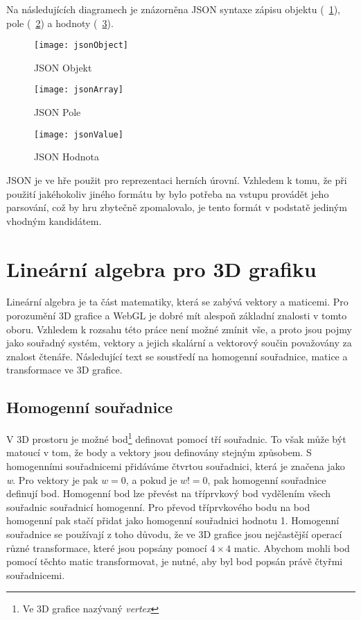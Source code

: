 Na následujících diagramech je znázorněna JSON syntaxe zápisu objektu (\figurename\ \ref{fig:jsonObject}), pole (\figurename\ \ref{fig:jsonArray}) a hodnoty (\figurename\ \ref{fig:jsonValue}).

\begin{figure}[htb]
\centering
\texttt{[image: jsonObject]}
\caption{JSON Objekt}
\label{fig:jsonObject}
\end{figure}

\begin{figure}[htb]
\centering
\texttt{[image: jsonArray]}
\caption{JSON Pole}
\label{fig:jsonArray}
\end{figure}

\begin{figure}[htb]
\centering
\texttt{[image: jsonValue]}
\caption{JSON Hodnota}
\label{fig:jsonValue}
\end{figure}

JSON je ve hře použit pro reprezentaci herních úrovní. Vzhledem k tomu, že při použití jakéhokoliv jiného formátu by bylo potřeba na vstupu provádět jeho parsování, což by hru zbytečně zpomalovalo, je tento formát v podstatě jediným vhodným kandidátem.

\section{Lineární algebra pro 3D grafiku}
\label{section:linearniAlgebra}
Lineární algebra je ta část matematiky, která se zabývá vektory a maticemi. Pro porozumění 3D grafice a WebGL je dobré mít alespoň základní znalosti v tomto oboru. Vzhledem k rozsahu této práce není možné zmínit vše, a proto jsou pojmy jako souřadný systém, vektory a jejich skalární a vektorový součin považovány za znalost čtenáře. Následující text se soustředí na homogenní souřadnice, matice a transformace ve 3D grafice.

\subsection*{Homogenní souřadnice}
\label{subsection:homogenniSouradnice}
V 3D prostoru je možné bod\footnote{Ve 3D grafice nazývaný \textit{vertex}} definovat pomocí tří souřadnic. To však může být matoucí v tom, že body a vektory jsou definovány stejným způsobem. S homogenními souřadnicemi přidáváme čtvrtou souřadnici, která je značena jako \textit{w}. Pro vektory je pak $w=0$, a pokud je $w!=0$, pak homogenní souřadnice definují bod. Homogenní bod lze převést na tříprvkový bod vydělením všech souřadnic souřadnicí homogenní. Pro převod tříprvkového bodu na bod homogenní pak stačí přidat jako homogenní souřadnici hodnotu 1. Homogenní souřadnice se používají z toho důvodu, že ve 3D grafice jsou nejčastější operací různé transformace, které jsou popsány pomocí $4\times4$ matic. Abychom mohli bod pomocí těchto matic transformovat, je nutné, aby byl bod popsán právě čtyřmi souřadnicemi.

